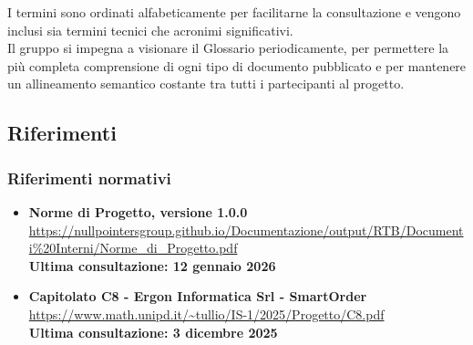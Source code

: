     I termini sono ordinati alfabeticamente per facilitarne la consultazione e vengono inclusi sia termini tecnici che acronimi significativi.\\
    Il gruppo si impegna a visionare il Glossario periodicamente, per permettere la più completa comprensione di ogni tipo di documento pubblicato e per mantenere un allineamento semantico costante tra tutti i partecipanti al progetto. 


	\subsection{Riferimenti}
	\subsubsection{Riferimenti normativi}

	\begin{itemize}[itemsep=5pt, parsep=5pt, label=$\scriptstyle\bullet$]

    \item \textbf{Norme di Progetto, versione 1.0.0}\\
    \url{https://nullpointersgroup.github.io/Documentazione/output/RTB/Documenti%20Interni/Norme_di_Progetto.pdf}\\[3pt]
    \textbf{Ultima consultazione: 12 gennaio 2026}

    \item \textbf{Capitolato C8 - Ergon Informatica Srl - SmartOrder}\\
    \url{https://www.math.unipd.it/~tullio/IS-1/2025/Progetto/C8.pdf}\\[3pt]
    \textbf{Ultima consultazione: 3 dicembre 2025}

	\end{itemize}

